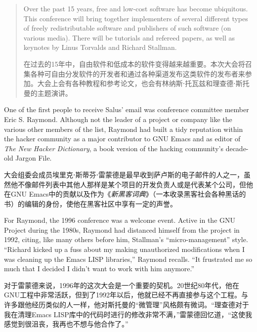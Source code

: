 \begin{quote}
\ifdefined\eng
Over the past 15 years, free and low-cost software has become ubiquitous. This conference will bring together implementers of several different types of freely redistributable software and publishers of such software (on various media). There will be tutorials and refereed papers, as well as keynotes by Linus Torvalds and Richard Stallman.
\fi

\ifdefined\chs
在过去的15年中，自由软件和低成本的软件变得越来越重要。本次大会将召集各种可自由分发软件的开发者和通过各种渠道发布这类软件的发布者来参加。大会上会有各种教程和参考论文，也会有林纳斯⋅托瓦兹和理查德⋅斯托曼的主题演讲。
\fi
\end{quote}

\ifdefined\eng
One of the first people to receive Salus' email was conference committee member Eric S. Raymond. Although not the leader of a project or company like the various other members of the list, Raymond had built a tidy reputation within the hacker community as a major contributor to GNU Emacs and as editor of \textit{The New Hacker Dictionary}, a book version of the hacking community's decade-old Jargon File.
\fi

\ifdefined\chs
大会组委会成员埃里克⋅斯蒂芬⋅雷蒙德是最早收到萨卢斯的电子邮件的人之一，虽然他不像邮件列表中其他人那样是某个项目的开发负责人或是代表某个公司，但他在GNU Emacs中的贡献以及作为《\textit{新黑客词典}》（一本收录黑客社会各种黑话的书）的编辑的身份，使他在黑客社区中享有一定的声誉。
\fi

\ifdefined\eng
For Raymond, the 1996 conference was a welcome event. Active in the GNU Project during the 1980s, Raymond had distanced himself from the project in 1992, citing, like many others before him, Stallman's ``micro-management'' style. ``Richard kicked up a fuss about my making unauthorized modifications when I was cleaning up the Emacs LISP libraries,'' Raymond recalls. ``It frustrated me so much that I decided I didn't want to work with him anymore.''
\fi

\ifdefined\chs
对于雷蒙德来说，1996年的这次大会是一个重要的契机。20世纪80年代，他在GNU工程中非常活跃，但到了1992年以后，他就已经不再直接参与这个工程。与许多跟他经历类似的人一样，他对斯托曼的``微管理''风格颇有微词。``理查德对于我在清理Emacs LISP库中的代码时进行的修改非常不满，''雷蒙德回忆道，``这使我感觉到很沮丧，我再也不想与他合作了。''
\fi

